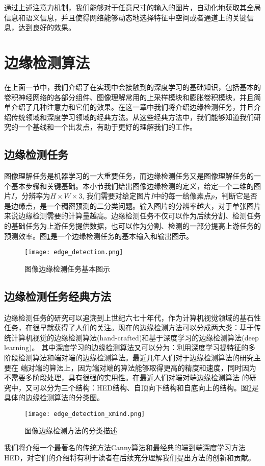 \documentclass[master]{thesis-uestc}
\begin{document}
通过上述注意力机制，我们能够对于任意尺寸的输入的图片，自动化地获取其全局信息和语义信息，并且使得网络能够动态地选择特征中空间或者通道上的关键信息，达到良好的效果。

\section{边缘检测算法}
在上面一节中，我们介绍了在实现中会接触到的深度学习的基础知识，包括基本的卷积神经网络的各部分组件、图像理解常用的上采样模块和膨胀卷积模块，并且简单介绍了几种注意力和它们的效果。在这一章中我们将介绍边缘检测任务，并且介绍传统领域和深度学习领域的经典方法。从这些经典方法中，我们能够知道我们研究的一个基线和一个出发点，有助于更好的理解我们的工作。

\subsection{边缘检测任务}
图像理解任务是机器学习的一大重要任务，而边缘检测任务又是图像理解任务的一个基本步骤和关键基础。本小节我们给出图像边缘检测的定义，给定一个二维的图片$I$，分辨率为$H \times W \times 3$, 我们需要对给定图片$I$中的每一给像素点$p$，判断它是否是边缘点，是一个稠密预测的二分类问题。输入图片的分辨率越大，对于单张图片来说边缘检测需要的计算量越高。边缘检测任务不仅可以作为后续分割、检测任务的基础任务为上游任务提供数据，也可以作为分割、检测的一部分提高上游任务的预测效率。图\ref{edge_detection}是一个边缘检测任务的基本输入和输出图示。

\begin{figure}[htb]
    \centering
    \texttt{[image: edge\_detection.png]}
    \caption{图像边缘检测任务基本图示}
    \label{edge_detection}
\end{figure}

\subsection{边缘检测任务经典方法}

边缘检测任务的研究可以追溯到上世纪六七十年代，作为计算机视觉领域的基石性任务，在很早就获得了人们的关注。现在的边缘检测方法可以分成两大类：基于传统计算机视觉的边缘检测算法(hand-crafted)和基于深度学习的边缘检测算法(deep learning)。 其中深度学习的边缘检测算法又可以分为：利用深度学习提特征的多阶段检测算法和端对端的边缘检测算法。最近几年人们对于边缘检测算法的研究主要在 端对端的算法上，因为端对端的算法能够取得更高的精度和速度，同时因为不需要多阶段处理，具有很强的实用性。在最近人们对端对端边缘检测算法 的研究中，又可以分为三个结构：HED结构、自顶向下结构和自底向上的结构。图\ref{edge_detection_xmind}是具体的边缘检测算法的分类图。
\begin{figure}[h!]
    \texttt{[image: edge\_detection\_xmind.png]}
    \caption{图像边缘检测方法的分类描述}
    \label{edge_detection_xmind}
\end{figure}
我们将介绍一个最著名的传统方法Canny算法和最经典的端到端深度学习方法HED，对它们的介绍将有利于读者在后续充分理解我们提出方法的创新和贡献。
\end{document}
